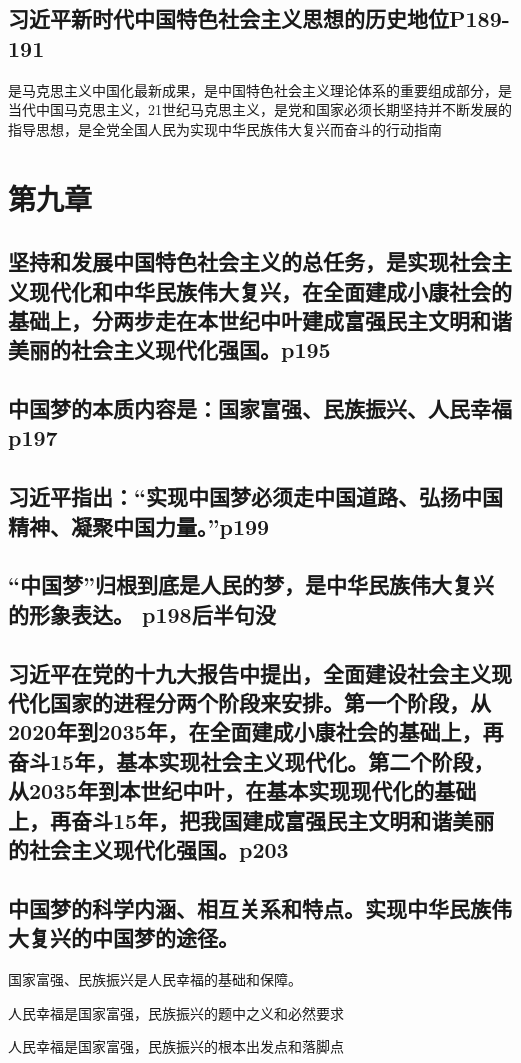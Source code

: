 \documentclass[UTF8]{ctexart}
\begin{document}
\subsection{习近平新时代中国特色社会主义思想的历史地位P189-191}
是马克思主义中国化最新成果，是中国特色社会主义理论体系的重要组成部分，是当代中国马克思主义，21世纪马克思主义，是党和国家必须长期坚持并不断发展的指导思想，是全党全国人民为实现中华民族伟大复兴而奋斗的行动指南
\section{第九章}
\subsection{坚持和发展中国特色社会主义的总任务，是实现社会主义现代化和中华民族伟大复兴，在全面建成小康社会的基础上，分两步走在本世纪中叶建成富强民主文明和谐美丽的社会主义现代化强国。p195}
\subsection{中国梦的本质内容是：国家富强、民族振兴、人民幸福p197}
\subsection{习近平指出：“实现中国梦必须走中国道路、弘扬中国精神、凝聚中国力量。”p199}
\subsection{“中国梦”归根到底是人民的梦，是中华民族伟大复兴的形象表达。 p198后半句没}
\subsection{习近平在党的十九大报告中提出，全面建设社会主义现代化国家的进程分两个阶段来安排。第一个阶段，从2020年到2035年，在全面建成小康社会的基础上，再奋斗15年，基本实现社会主义现代化。第二个阶段，从2035年到本世纪中叶，在基本实现现代化的基础上，再奋斗15年，把我国建成富强民主文明和谐美丽的社会主义现代化强国。p203}
\subsection{中国梦的科学内涵、相互关系和特点。实现中华民族伟大复兴的中国梦的途径。}
\par 国家富强、民族振兴是人民幸福的基础和保障。
\par 人民幸福是国家富强，民族振兴的题中之义和必然要求
\par 人民幸福是国家富强，民族振兴的根本出发点和落脚点
\end{document}
